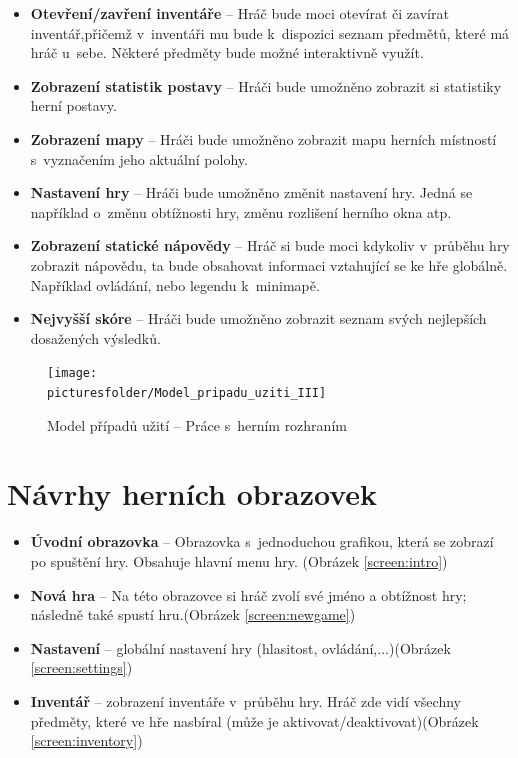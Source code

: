 \documentclass[12pt,a4paper]{article}
\def\picturesfolder{obrazky}
\begin{document}
\begin {itemize}
\item{\textbf{Otevření/zavření inventáře} --  Hráč bude moci otevírat či zavírat
  inventář,přičemž v~inventáři mu bude k~dispozici seznam předmětů, které má
  hráč u~sebe.  Některé předměty bude možné interaktivně využít.}
\item{\textbf{Zobrazení statistik postavy} --  Hráči bude umožněno zobrazit si
  statistiky herní postavy.}
\item{\textbf{Zobrazení mapy} --  Hráči bude umožněno zobrazit mapu herních
  místností s~vyznačením jeho aktuální polohy.}
\item{\textbf{Nastavení hry} --  Hráči bude umožněno změnit nastavení hry. Jedná
  se například o~změnu obtížnosti hry, změnu rozlišení herního okna atp.}
\item{\textbf{Zobrazení statické nápovědy} --  Hráč si bude moci kdykoliv
v~průběhu hry zobrazit nápovědu, ta bude obsahovat informaci vztahující se ke hře
  globálně.  Například ovládání, nebo legendu k~minimapě.}
\item{\textbf{Nejvyšší skóre} --  Hráči bude umožněno zobrazit seznam svých
  nejlepších dosažených výsledků.}
\end {itemize}

\begin{figure}
\begin{center}
  \texttt{[image: \\picturesfolder/Model\_pripadu\_uziti\_III]}
  \caption{Model případů užití -- Práce s~herním rozhraním}
  \label{uc:rozhrani}
\end{center}
\end{figure}

\newpage

\section{Návrhy herních obrazovek}
\begin{itemize}
  \item{\textbf{Úvodní obrazovka} -- Obrazovka s~jednoduchou grafikou, která se
    zobrazí po spuštění hry. Obsahuje hlavní menu hry. (Obrázek
    \ref{screen:intro})}
  \item{\textbf{Nová hra} -- Na této obrazovce si hráč zvolí své jméno a
    obtížnost hry; následně také spustí hru.(Obrázek \ref{screen:newgame})}
  \item{\textbf{Nastavení} -- globální nastavení hry (hlasitost,
    ovládání,$\dots$)(Obrázek \ref{screen:settings})}
  \item{\textbf{Inventář} -- zobrazení inventáře v~průběhu hry. Hráč zde vidí
    všechny předměty, které ve hře nasbíral (může je
    aktivovat/deaktivovat)(Obrázek \ref{screen:inventory})}
\end{itemize}
\end{document}
